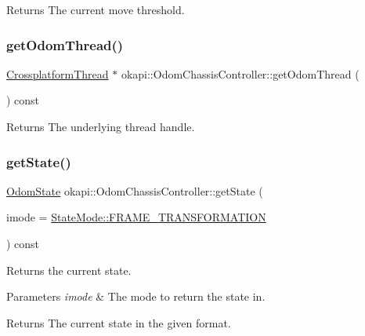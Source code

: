 \begin{DoxyReturn}{Returns}
The current move threshold. 
\end{DoxyReturn}
\mbox{\label{classokapi_1_1OdomChassisController_a6ab78730e502dc551894e7efdb9f4edf}} 
\subsubsection{\texorpdfstring{getOdomThread()}{getOdomThread()}}
{\footnotesize\ttfamily \mbox{\hyperlink{classCrossplatformThread}{Crossplatform\+Thread}} $\ast$ okapi\+::\+Odom\+Chassis\+Controller\+::get\+Odom\+Thread (\begin{DoxyParamCaption}{ }\end{DoxyParamCaption}) const}

\begin{DoxyReturn}{Returns}
The underlying thread handle. 
\end{DoxyReturn}
\mbox{\label{classokapi_1_1OdomChassisController_aa7b4675edd3cdd920e287fc5e824892f}} 
\subsubsection{\texorpdfstring{getState()}{getState()}}
{\footnotesize\ttfamily \mbox{\hyperlink{structokapi_1_1OdomState}{Odom\+State}} okapi\+::\+Odom\+Chassis\+Controller\+::get\+State (\begin{DoxyParamCaption}\item[{const \mbox{\hyperlink{namespaceokapi_af37fbd761bd859a00ff4dd4a87dd8c07}{State\+Mode}} \&}]{imode = {\ttfamily \mbox{\hyperlink{namespaceokapi_af37fbd761bd859a00ff4dd4a87dd8c07ad5ed7666e5cebf60d3af20a5a46edf3b}{State\+Mode\+::\+F\+R\+A\+M\+E\+\_\+\+T\+R\+A\+N\+S\+F\+O\+R\+M\+A\+T\+I\+ON}}} }\end{DoxyParamCaption}) const\hspace{0.3cm}{\ttfamily [virtual]}}

Returns the current state.


\begin{DoxyParams}{Parameters}
{\em imode} & The mode to return the state in. \\
\hline
\end{DoxyParams}
\begin{DoxyReturn}{Returns}
The current state in the given format. 
\end{DoxyReturn}
\mbox{\label{classokapi_1_1OdomChassisController_a17e3855a8b8ecdb9a027828d604722d9}} 
